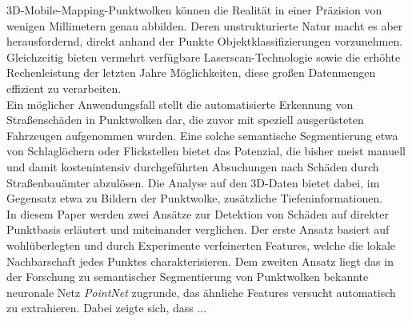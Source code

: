 

\pfinal
3D-Mobile-Mapping-Punktwolken können die Realität in einer Präzision von wenigen Millimetern genau abbilden. Deren unstrukturierte Natur macht es aber herausfordernd, direkt anhand der Punkte Objektklassifizierungen vorzunehmen. Gleichzeitig bieten vermehrt verfügbare Laserscan-Technologie sowie die erhöhte Rechenleistung der letzten Jahre Möglichkeiten, diese großen Datenmengen effizient zu verarbeiten. \\
Ein möglicher Anwendungsfall stellt die automatisierte Erkennung von Straßenschäden in Punktwolken dar, die zuvor mit speziell ausgerüsteten Fahrzeugen aufgenommen wurden. Eine solche semantische Segmentierung etwa von Schlaglöchern oder Flickstellen bietet das Potenzial, die bisher meist manuell und damit kostenintensiv durchgeführten Absuchungen nach Schäden durch Straßenbauämter abzulösen. Die Analyse auf den 3D-Daten bietet dabei, im Gegensatz etwa zu Bildern der Punktwolke, zusätzliche Tiefeninformationen. \\
In diesem Paper werden zwei Ansätze zur Detektion von Schäden auf direkter Punktbasis erläutert und miteinander verglichen. Der erste Ansatz basiert auf wohlüberlegten und durch Experimente verfeinerten Features, welche die lokale Nachbarschaft jedes Punktes charakterisieren. Dem zweiten Ansatz liegt das in der Forschung zu semantischer Segmentierung von Punktwolken bekannte neuronale Netz \textit{PointNet} zugrunde, das ähnliche Features versucht automatisch zu extrahieren.
Dabei zeigte sich, dass ... 

\cleardoublepage